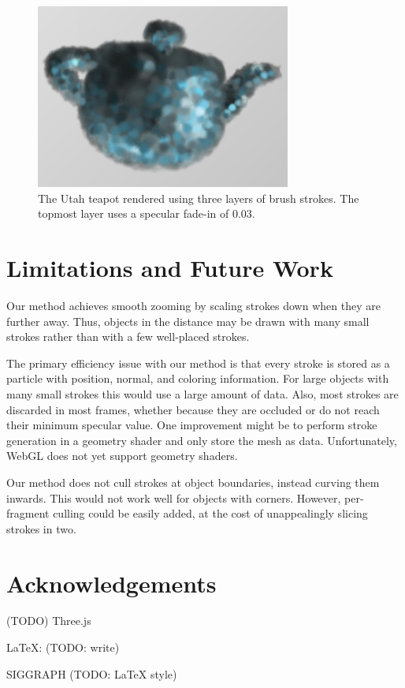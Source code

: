 \documentclass[conference]{acmsiggraph}
\begin{document}
\begin{figure}[ht]
  \centering
  \includegraphics[width=3.3in]{images/teapot_with_background}
  \caption{The Utah teapot rendered using three layers of brush strokes.
           The topmost layer uses a specular fade-in of 0.03.}
\end{figure}


\section{Limitations and Future Work}

Our method achieves smooth zooming by scaling strokes down when they are
further away. Thus, objects in the distance may be drawn with many small
strokes rather than with a few well-placed strokes.

The primary efficiency issue with our method is that every stroke is stored as
a particle with position, normal, and coloring information. For large objects
with many small strokes this would use a large amount of data. Also, most
strokes are discarded in most frames, whether because they are occluded or do
not reach their minimum specular value. One improvement might be to perform
stroke generation in a geometry shader and only store the mesh as data.
Unfortunately, WebGL does not yet support geometry shaders.

Our method does not cull strokes at object boundaries, instead curving them
inwards. This would not work well for objects with corners. However,
per-fragment culling could be easily added, at the cost of unappealingly
slicing strokes in two.


\section*{Acknowledgements}

(TODO) Three.js

\LaTeX : (TODO: write)

SIGGRAPH (TODO: LaTeX style)




\end{document}
